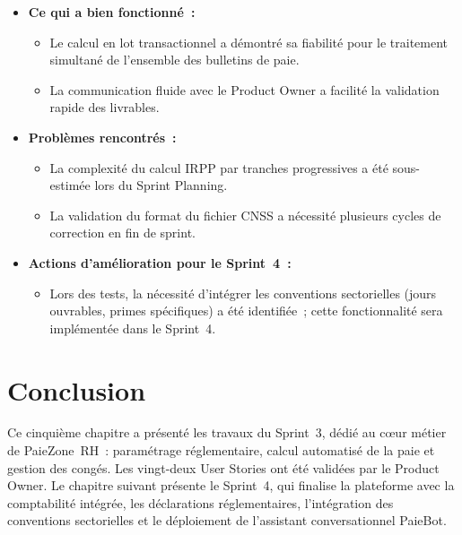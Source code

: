 \begin{itemize}[label=\textbullet, leftmargin=0.6cm]

    \item \textbf{Ce qui a bien fonctionné~:}
    \begin{itemize}[label=\textbullet, leftmargin=0.8cm]
        \item Le calcul en lot transactionnel a démontré sa fiabilité pour
              le traitement simultané de l'ensemble des bulletins de paie.
        \item La communication fluide avec le Product Owner a facilité la
              validation rapide des livrables.
    \end{itemize}

    \item \textbf{Problèmes rencontrés~:}
    \begin{itemize}[label=\textbullet, leftmargin=0.8cm]
        \item La complexité du calcul IRPP par tranches progressives a été
              sous-estimée lors du Sprint Planning.
        \item La validation du format du fichier CNSS a nécessité plusieurs
              cycles de correction en fin de sprint.
    \end{itemize}

    \item \textbf{Actions d'amélioration pour le Sprint~4~:}
    \begin{itemize}[label=\textbullet, leftmargin=0.8cm]
        \item Lors des tests, la nécessité d'intégrer les conventions
              sectorielles (jours ouvrables, primes spécifiques) a été
              identifiée~; cette fonctionnalité sera implémentée dans
              le Sprint~4.
    \end{itemize}

\end{itemize}
\section*{Conclusion}
\label{sec:s3-conclusion}
Ce cinquième chapitre a présenté les travaux du Sprint~3, dédié au
c\oe{}ur métier de PaieZone~RH~: paramétrage réglementaire, calcul
automatisé de la paie et gestion des congés. Les vingt-deux User
Stories ont été validées par le Product Owner. Le chapitre suivant
présente le Sprint~4, qui finalise la plateforme avec la comptabilité
intégrée, les déclarations réglementaires, l'intégration des conventions
sectorielles et le déploiement de l'assistant conversationnel PaieBot.